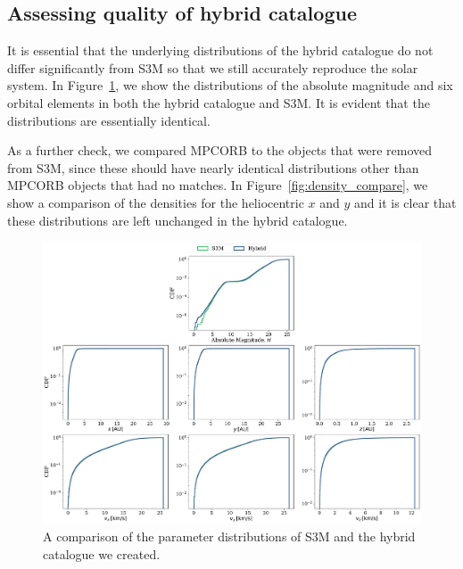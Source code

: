 \documentclass[twocolumn]{aastex631}
\newcommand{\sss}{S3M}
\newcommand{\mpco}{MPCORB}
\begin{document}
\subsection{Assessing quality of hybrid catalogue}\label{app:hybrid_quality}
It is essential that the underlying distributions of the hybrid catalogue do not differ significantly from \sss{} so that we still accurately reproduce the solar system. In Figure~\ref{fig:hybrid_vs_s3m_dists}, we show the distributions of the absolute magnitude and six orbital elements in both the hybrid catalogue and \sss{}. It is evident that the distributions are essentially identical.

As a further check, we compared \mpco{} to the objects that were removed from \sss{}, since these should have nearly identical distributions other than MPCORB objects that had no matches. In Figure~\ref{fig:density_compare}, we show a comparison of the densities for the heliocentric $x$ and $y$ and it is clear that these distributions are left unchanged in the hybrid catalogue.
\begin{figure}[htb]
    \centering
    \includegraphics[width=\textwidth]{hybrid_vs_s3m_distributions.pdf}
    \caption{A comparison of the parameter distributions of \sss{} \citep{Grav+2011} and the hybrid catalogue we created.}
    \label{fig:hybrid_vs_s3m_dists}
\end{figure}
\end{document}
